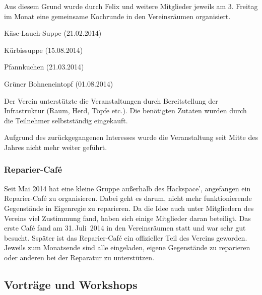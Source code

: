 \documentclass[ngerman]{scrartcl}
\begin{document}
Aus diesem Grund wurde durch Felix und weitere Mitglieder jeweils am 3. Freitag
im Monat eine gemeinsame Kochrunde in den Vereinsräumen organisiert.

\begin{compactitem}
    \item Käse-Lauch-Suppe (21.02.2014)
    \item Kürbissuppe (15.08.2014)
    \item Pfannkuchen (21.03.2014)
    \item Grüner Bohneneintopf (01.08.2014)
\end{compactitem}

Der Verein unterstützte die Veranstaltungen durch Bereitstellung der
Infrastruktur (Raum, Herd, Töpfe etc.). Die benötigten Zutaten wurden
durch die Teilnehmer selbstständig eingekauft. 

Aufgrund des zurückgegangenen Interesses wurde die Veranstaltung seit Mitte des Jahres nicht mehr weiter geführt. 

\subsubsection{Reparier-Café}

Seit Mai 2014 hat eine kleine Gruppe außerhalb des Hackspace', angefangen ein Reparier-Café zu organisieren. Dabei geht es darum, nicht mehr funktionierende Gegenstände in Eigenregie zu reparieren.
Da die Idee auch unter Mitgliedern des Vereins viel Zustimmung fand, haben sich einige Mitglieder daran beteiligt. 
Das erste Café fand am 31.\,Juli~2014 in den Vereinsräumen statt und war sehr gut besucht. 
Sspäter ist das Reparier-Café ein offizieller Teil des Vereins geworden. Jeweils zum Monatsende sind alle eingeladen, eigene Gegenstände zu reparieren oder anderen bei der Reparatur zu unterstützen.


\subsection{Vorträge und Workshops}
\end{document}
